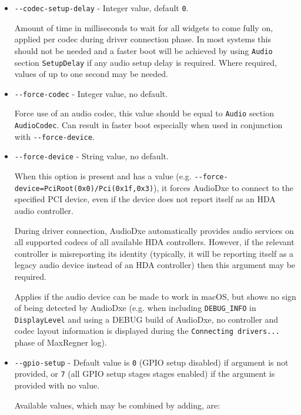 \documentclass[]{article}
\providecommand{\tightlist}{%
  \setlength{\itemsep}{0pt}\setlength{\parskip}{0pt}}
\begin{document}
\begin{itemize}
  \tightlist
  \item \texttt{-{}-codec-setup-delay} - Integer value, default \texttt{0}. \medskip

  Amount of time in milliseconds to wait for all widgets to come fully on, applied per codec
  during driver connection phase. In most systems this should not be needed and a faster boot
  will be achieved by using \texttt{Audio} section \texttt{SetupDelay} if any audio setup delay
  is required. Where required, values of up to one second may be needed. \medskip

  \item \texttt{-{}-force-codec} - Integer value, no default. \medskip

  Force use of an audio codec, this value should be equal to \texttt{Audio} section \texttt{AudioCodec}.
  Can result in faster boot especially when used in conjunction with \texttt{-{}-force-device}. \medskip

  \item \texttt{-{}-force-device} - String value, no default. \medskip

  When this option is present and has a value (e.g. \texttt{-{}-force-device=PciRoot(0x0)/Pci(0x1f,0x3)}), it
  forces AudioDxe to connect to the specified PCI device, even if the device does not report itself as
  an HDA audio controller.

  During driver connection, AudioDxe automatically provides audio services on all supported codecs of
  all available HDA controllers. However, if the relevant controller is misreporting its identity
  (typically, it will be reporting itself as a legacy audio device instead of an HDA controller)
  then this argument may be required.

  Applies if the audio device can be made to work in macOS, but shows no sign of being detected by AudioDxe
  (e.g. when including \texttt{DEBUG\_INFO} in \texttt{DisplayLevel} and using a DEBUG build of AudioDxe,
  no controller and codec layout information is displayed during the \texttt{Connecting drivers...}
  phase of MaxRegner log). \medskip

  \item \texttt{-{}-gpio-setup} - Default value is \texttt{0} (GPIO setup disabled) if argument is not provided,
  or \texttt{7} (all GPIO setup stages stages enabled) if the argument is provided with no value. \medskip

  Available values, which may be combined by adding, are: \medskip


\end{itemize}
\end{document}
